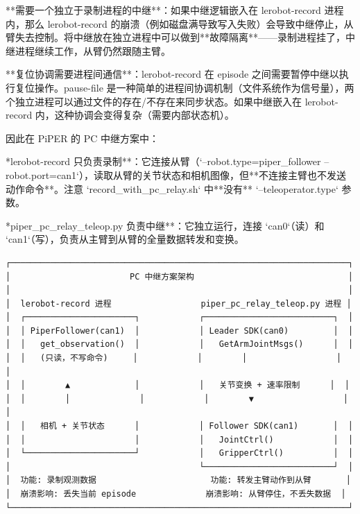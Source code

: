 \documentclass[UTF8,a4paper,11pt]{ctexart}
\begin{document}
{\item[2] **需要一个独立于录制进程的中继**：如果中继逻辑嵌入在 lerobot-record 进程内，那么 lerobot-record 的崩溃（例如磁盘满导致写入失败）会导致中继停止，从臂失去控制。将中继放在独立进程中可以做到**故障隔离**——录制进程挂了，中继进程继续工作，从臂仍然跟随主臂。

\item[3] **复位协调需要进程间通信**：lerobot-record 在 episode 之间需要暂停中继以执行复位操作。pause-file 是一种简单的进程间协调机制（文件系统作为信号量），两个独立进程可以通过文件的存在/不存在来同步状态。如果中继嵌入在 lerobot-record 内，这种协调会变得复杂（需要内部状态机）。

因此在 PiPER 的 PC 中继方案中：
\item **lerobot-record 只负责录制**：它连接从臂（`--robot.type=piper_follower --robot.port=can1`），读取从臂的关节状态和相机图像，但**不连接主臂也不发送动作命令**。注意 `record_with_pc_relay.sh` 中**没有** `--teleoperator.type` 参数。
\item **piper_pc_relay_teleop.py 负责中继**：它独立运行，连接 `can0`（读）和 `can1`（写），负责从主臂到从臂的全量数据转发和变换。

\begin{lstlisting}[language=text]
┌────────────────────────────────────────────────────────────────────┐
│                        PC 中继方案架构                               │
│                                                                    │
│  lerobot-record 进程                  piper_pc_relay_teleop.py 进程 │
│  ┌──────────────────────┐            ┌──────────────────────────┐  │
│  │ PiperFollower(can1)  │            │ Leader SDK(can0)         │  │
│  │   get_observation()  │            │   GetArmJointMsgs()      │  │
│  │   (只读，不写命令)     │            │        │                  │  │
│  │        ▲             │            │   关节变换 + 速率限制      │  │
│  │        │              │            │        ▼                  │  │
│  │   相机 + 关节状态      │            │ Follower SDK(can1)       │  │
│  │                      │            │   JointCtrl()            │  │
│  └──────────────────────┘            │   GripperCtrl()          │  │
│                                      └──────────────────────────┘  │
│  功能: 录制观测数据                       功能: 转发主臂动作到从臂       │
│  崩溃影响: 丢失当前 episode              崩溃影响: 从臂停住，不丢失数据  │
└────────────────────────────────────────────────────────────────────┘
\end{lstlisting}

}
\end{document}
